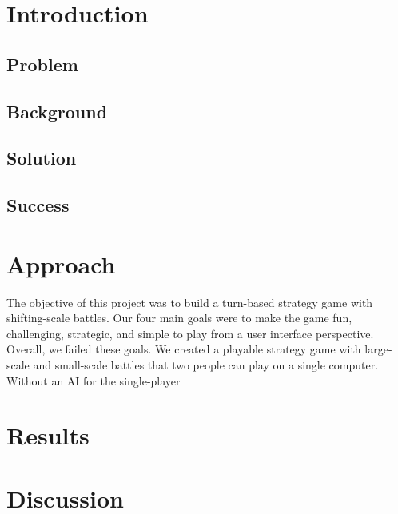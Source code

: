 \documentclass{article}
\begin{document}
\clearpage

\section*{Introduction}

\subsection*{Problem}

\subsection*{Background}

\subsection*{Solution}

\subsection*{Success}

\section*{Approach}
The objective of this project was to build a turn-based strategy game with shifting-scale battles.
Our four main goals were to make the game fun, challenging, strategic, and simple to play from a user interface perspective.
Overall, we failed these goals.
We created a playable strategy game with large-scale and small-scale battles that two people can play on a single computer.
Without an AI for the single-player

\section*{Results}

\section*{Discussion}
\end{document}
